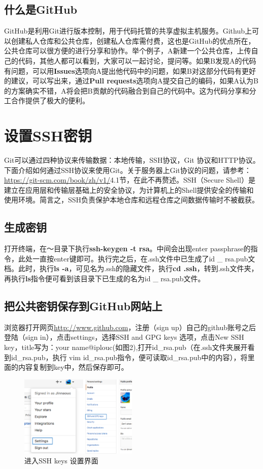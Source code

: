 \documentclass{article}
\begin{document}
\subsection{什么是GitHub}

GitHub是利用Git进行版本控制，用于代码托管的共享虚拟主机服务。Github上可以创建私人仓库和公共仓库，创建私人仓库需付费，这也是GitHub的优点所在，公共仓库可以很方便的进行分享和协作。举个例子，A新建一个公共仓库，上传自己的代码，其他人都可以看到，大家可以一起讨论，提问等。如果B发现A的代码有问题，可以用\textbf{Issues}选项向A提出他代码中的问题，如果B对这部分代码有更好的建议，可以写出来，通过\textbf{Pull requests}选项向A提交自己的编码，如果A认为B的方案确实不错，A将会把B贡献的代码融合到自己的代码中。这为代码分享和分工合作提供了极大的便利。



\section{设置SSH密钥}
Git可以通过四种协议来传输数据：本地传输，SSH协议，Git 协议和HTTP协议。下面介绍如何通过SSH协议来使用Git。关于服务器上Git协议的问题，请参考：\url{https://git-scm.com/book/zh/v1/}4.1节，在此不再赘述。SSH（Secure Shell）是建立在应用层和传输层基础上的安全协议，为计算机上的Shell提供安全的传输和使用环境。简言之，SSH负责保护本地仓库和远程仓库之间数据传输时不被截获。

\subsection{生成密钥}
打开终端，在～目录下执行\textbf{ssh-keygen -t rsa}。中间会出现enter passphrase的指令，此处一直按enter键即可。执行完之后，在.ssh文件中已生成了id \_ rsa.pub文档。此时，执行\textbf{ls -a}，可见名为.ssh的隐藏文件，执行\textbf{cd .ssh}，转到.ssh文件夹，再执行\textbf{ls}指令便可看到该目录下已生成的名为id \_ rsa.pub文件。

\subsection{把公共密钥保存到GitHub网站上}
浏览器打开网页\url{http://www.github.com}，注册（sign up）自己的github账号之后登陆（sign in），点击settings，选择SSH and GPG keys 选项，点击New SSH key，title写为：your name@iplouc(如图2),打开id\_rsa.pub（在.ssh文件夹展开看到id\_rsa.pub，执行 vim id\_rsa.pub指令，便可读取id\_rsa.pub中的内容），将里面的内容复制到key中，然后保存即可。

\begin{figure}[!htb] %
\centering \includegraphics[width=0.5\textwidth]{fig2.png} \caption{进入SSH keys 设置界面}
\label{fig:1}
\end{figure}
\end{document}
